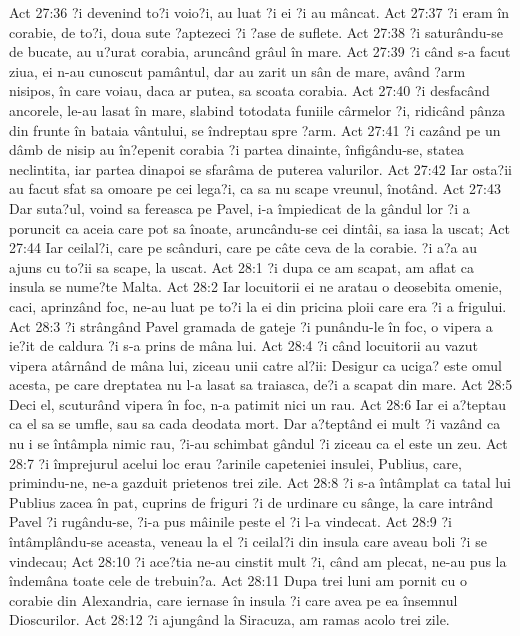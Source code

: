 Act 27:36  ?i devenind to?i voio?i, au luat ?i ei ?i au mâncat.
Act 27:37  ?i eram în corabie, de to?i, doua sute ?aptezeci ?i ?ase de suflete.
Act 27:38  ?i saturându-se de bucate, au u?urat corabia, aruncând grâul în mare.
Act 27:39  ?i când s-a facut ziua, ei n-au cunoscut pamântul, dar au zarit un sân de mare, având ?arm nisipos, în care voiau, daca ar putea, sa scoata corabia.
Act 27:40  ?i desfacând ancorele, le-au lasat în mare, slabind totodata funiile cârmelor ?i, ridicând pânza din frunte în bataia vântului, se îndreptau spre ?arm.
Act 27:41  ?i cazând pe un dâmb de nisip au în?epenit corabia ?i partea dinainte, înfigându-se, statea neclintita, iar partea dinapoi se sfarâma de puterea valurilor.
Act 27:42  Iar osta?ii au facut sfat sa omoare pe cei lega?i, ca sa nu scape vreunul, înotând.
Act 27:43  Dar suta?ul, voind sa fereasca pe Pavel, i-a împiedicat de la gândul lor ?i a poruncit ca aceia care pot sa înoate, aruncându-se cei dintâi, sa iasa la uscat;
Act 27:44  Iar ceilal?i, care pe scânduri, care pe câte ceva de la corabie. ?i a?a au ajuns cu to?ii sa scape, la uscat.
Act 28:1  ?i dupa ce am scapat, am aflat ca insula se nume?te Malta.
Act 28:2  Iar locuitorii ei ne aratau o deosebita omenie, caci, aprinzând foc, ne-au luat pe to?i la ei din pricina ploii care era ?i a frigului.
Act 28:3  ?i strângând Pavel gramada de gateje ?i punându-le în foc, o vipera a ie?it de caldura ?i s-a prins de mâna lui.
Act 28:4  ?i când locuitorii au vazut vipera atârnând de mâna lui, ziceau unii catre al?ii: Desigur ca uciga? este omul acesta, pe care dreptatea nu l-a lasat sa traiasca, de?i a scapat din mare.
Act 28:5  Deci el, scuturând vipera în foc, n-a patimit nici un rau.
Act 28:6  Iar ei a?teptau ca el sa se umfle, sau sa cada deodata mort. Dar a?teptând ei mult ?i vazând ca nu i se întâmpla nimic rau, ?i-au schimbat gândul ?i ziceau ca el este un zeu.
Act 28:7  ?i împrejurul acelui loc erau ?arinile capeteniei insulei, Publius, care, primindu-ne, ne-a gazduit prietenos trei zile.
Act 28:8  ?i s-a întâmplat ca tatal lui Publius zacea în pat, cuprins de friguri ?i de urdinare cu sânge, la care intrând Pavel ?i rugându-se, ?i-a pus mâinile peste el ?i l-a vindecat.
Act 28:9  ?i întâmplându-se aceasta, veneau la el ?i ceilal?i din insula care aveau boli ?i se vindecau;
Act 28:10  ?i ace?tia ne-au cinstit mult ?i, când am plecat, ne-au pus la îndemâna toate cele de trebuin?a.
Act 28:11  Dupa trei luni am pornit cu o corabie din Alexandria, care iernase în insula ?i care avea pe ea însemnul Dioscurilor.
Act 28:12  ?i ajungând la Siracuza, am ramas acolo trei zile.
